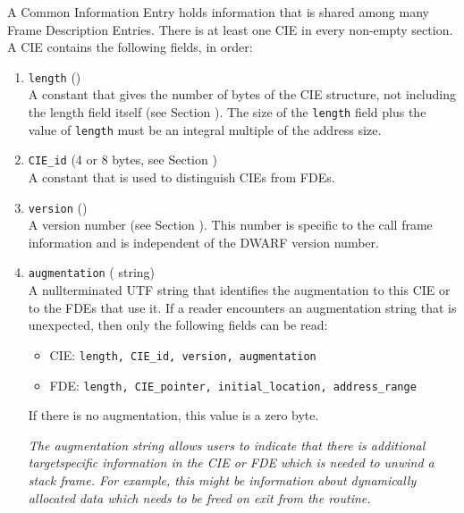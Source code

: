 A Common Information Entry holds information that is shared
among many Frame Description Entries. There is at least one
CIE in every non-empty \dotdebugframe{} section. A CIE contains
the following fields, in order:
\begin{enumerate}[1. ]
\item \texttt{length} ()  \\
A constant that gives the number of bytes of the CIE structure,
not including the length field itself 
(see Section ). 
The
size of the \texttt{length} field plus the value of \texttt{length} must be an
integral multiple of the address size.

\item  \texttt{CIE\_id} (4 or 8 bytes, see Section ) \\
A constant that is used to distinguish CIEs from FDEs.

\item  \texttt{version} () \\
A version number 
(see Section ). 
This number is specific to the call frame information
and is independent of the DWARF version number.

\item  \texttt{augmentation} ( string) \\
A null\dash terminated UTF string that identifies the augmentation
to this CIE or to the FDEs that use it. If a reader encounters
an augmentation string that is unexpected, then only the
following fields can be read:


\begin{itemize}

\item CIE: \texttt{length, CIE\_id, version, augmentation}

\item FDE: \texttt{length, CIE\_pointer, initial\_location, address\_range}

\end{itemize}
If there is no augmentation, this value is a zero byte.

\textit{The augmentation string allows users to indicate that there
is additional target\dash specific information in the CIE or FDE
which is needed to unwind a stack frame. For example, this
might be information about dynamically allocated data which
needs to be freed on exit from the routine.}


\end{enumerate}
